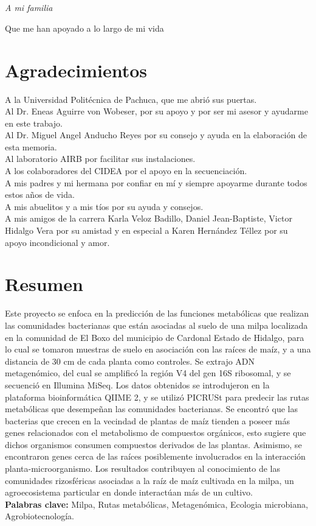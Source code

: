 \documentclass[12pt,letterpaper,oneside]{report}
\begin{document}
\chapter*{}
\begin{center}
\emph{\LARGE A mi familia}\\[1cm]
\end{center}
\begin{flushright}
Que me han apoyado a lo largo de mi vida
\end{flushright}
\chapter*{Agradecimientos} 
A la Universidad Politécnica de Pachuca, que me abrió sus puertas.
\\[1cm]
Al Dr. Eneas Aguirre von Wobeser, por su apoyo y por ser mi asesor y ayudarme en este trabajo.
\\[1cm]
Al Dr. Miguel Angel Anducho Reyes por su consejo y ayuda en la elaboración de esta memoria.
\\[1cm]
Al laboratorio AIRB por facilitar sus instalaciones.
\\[1cm]
A los colaboradores del CIDEA por el apoyo en la secuenciación.
\\[1cm]
A mis padres y mi hermana por confiar en mí y siempre apoyarme durante todos estos años de vida.
\\[1cm]
A mis abuelitos y a mis tíos por su ayuda y consejos.
\\[1cm]
A mis amigos de la carrera Karla Veloz Badillo, Daniel Jean-Baptiste, Victor Hidalgo Vera por su amistad y en especial a Karen Hernández Téllez por su apoyo incondicional y amor.
\chapter*{Resumen}
Este proyecto se enfoca en la predicción de las funciones metabólicas que realizan las comunidades bacterianas que están asociadas al suelo de una milpa localizada en la comunidad de El Boxo del municipio de Cardonal Estado de Hidalgo, para lo cual se tomaron muestras de suelo en asociación con las raíces de maíz, y a una distancia de 30 cm de cada planta como controles. Se extrajo ADN metagenómico, del cual se amplificó la región V4 del gen 16S ribosomal, y se secuenció en Illumina MiSeq. Los datos obtenidos se introdujeron en la plataforma bioinformática QIIME 2, y se utilizó PICRUSt para predecir las rutas metabólicas que desempeñan las comunidades bacterianas. Se encontró que las bacterias que crecen en la vecindad de plantas de maíz tienden a poseer más genes relacionados con el metabolismo de compuestos orgánicos, esto sugiere que dichos organismos consumen compuestos derivados de las plantas. Asimismo, se encontraron genes cerca de las raíces posiblemente involucrados en la interacción planta-microorganismo. Los resultados contribuyen al conocimiento de las comunidades rizosféricas asociadas a la raíz de maíz cultivada en la milpa, un agroecosistema particular en donde interactúan más de un cultivo.
\\[2cm]
\textbf{Palabras clave:} Milpa, Rutas metabólicas, Metagenómica, Ecologia microbiana, Agrobiotecnología.
\end{document}
